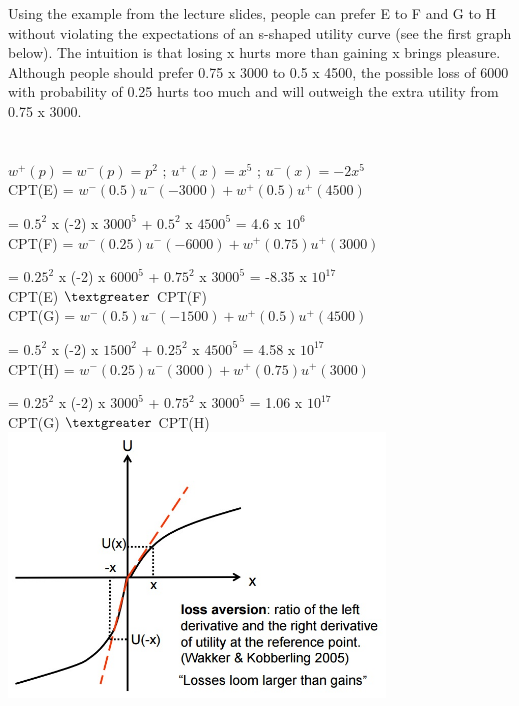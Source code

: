 \documentclass{article}
\begin{document}
Using the example from the lecture slides, people can prefer E to F and G to H without violating the expectations of an s-shaped utility curve (see the first graph below). The intuition is that losing x hurts more than gaining x brings pleasure. Although people should prefer 0.75 x 3000 to 0.5 x 4500, the possible loss of 6000 with probability of 0.25 hurts too much and will outweigh the extra utility from 0.75 x 3000.\\ \\ \\

$w^+(p)=w^-(p)=p^2$  ;  
$u^+(x)=x^5$  ;  
$u^-(x)=-2x^5$ \\


CPT(E) = $w^-(0.5)u^-(-3000)+w^+(0.5)u^+(4500)$ 

= $0.5^2$ x (-2) x $3000^5$ + $0.5^2$ x $4500^5$ = 4.6 x $10^6$  \\

CPT(F) = $w^-(0.25)u^-(-6000)+w^+(0.75)u^+(3000)$

= $0.25^2$ x (-2) x $6000^5$ + $0.75^2$ x $3000^5$ = -8.35 x $10^{17}$ \\

CPT(E) $\textgreater$ CPT(F) \\

CPT(G) = $w^-(0.5)u^-(-1500)+w^+(0.5)u^+(4500)$

= $0.5^2$ x (-2) x $1500^2$ + $0.25^2$ x $4500^5$ = 4.58 x $10^{17}$ \\

CPT(H) = $w^-(0.25)u^-(3000)+w^+(0.75)u^+(3000)$

= $0.25^2$ x (-2) x $3000^5$ + $0.75^2$ x $3000^5$ = 1.06 x $10^{17}$ \\

CPT(G) $\textgreater$ CPT(H) \\



\includegraphics[width=10cm]{Graph1} \\
\end{document}
